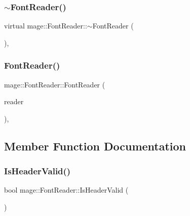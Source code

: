 \hypertarget{classmage_1_1_font_reader_afcc9234d16d83d1451d2413006fc9d83}{}\label{classmage_1_1_font_reader_afcc9234d16d83d1451d2413006fc9d83} 
\subsubsection{\texorpdfstring{$\sim$\+Font\+Reader()}{~FontReader()}}
{\footnotesize\ttfamily virtual mage\+::\+Font\+Reader\+::$\sim$\+Font\+Reader (\begin{DoxyParamCaption}{ }\end{DoxyParamCaption})\hspace{0.3cm}{\ttfamily [virtual]}, {\ttfamily [default]}}

\hypertarget{classmage_1_1_font_reader_ab6009e74fb232f10a96982ef26d6e981}{}\label{classmage_1_1_font_reader_ab6009e74fb232f10a96982ef26d6e981} 
\subsubsection{\texorpdfstring{Font\+Reader()}{FontReader()}\hspace{0.1cm}{\footnotesize\ttfamily [2/2]}}
{\footnotesize\ttfamily mage\+::\+Font\+Reader\+::\+Font\+Reader (\begin{DoxyParamCaption}\item[{const \hyperlink{classmage_1_1_font_reader}{Font\+Reader} \&}]{reader }\end{DoxyParamCaption})\hspace{0.3cm}{\ttfamily [private]}, {\ttfamily [delete]}}



\subsection{Member Function Documentation}
\hypertarget{classmage_1_1_font_reader_a3fe3dfd3f2be8e156396ae8e7cfec551}{}\label{classmage_1_1_font_reader_a3fe3dfd3f2be8e156396ae8e7cfec551} 
\subsubsection{\texorpdfstring{Is\+Header\+Valid()}{IsHeaderValid()}}
{\footnotesize\ttfamily bool mage\+::\+Font\+Reader\+::\+Is\+Header\+Valid (\begin{DoxyParamCaption}{ }\end{DoxyParamCaption})\hspace{0.3cm}{\ttfamily [protected]}}


